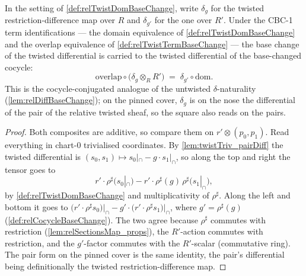 \begin{theorem}
  \label{thm:relTwistDiffBaseChange}
  \leanok
  In the setting of \ref{def:relTwistDomBaseChange}, write \(\delta_g\) for the
  twisted restriction-difference map over \(R\) and \(\delta_{g'}\) for the one over
  \(R'\). Under the CBC-1 term identifications --- the domain equivalence of
  \ref{def:relTwistDomBaseChange} and the overlap equivalence of
  \ref{def:relTwistTermBaseChange} --- the base change of the twisted differential is
  carried to the twisted differential of the base-changed cocycle:
  \[
    \mathrm{overlap}\circ\bigl(\delta_g \otimes_R R'\bigr)
      \;=\; \delta_{g'} \circ \mathrm{dom} .
  \]
  This is the cocycle-conjugated analogue of the untwisted \(\delta\)-naturality
  (\ref{lem:relDiffBaseChange}); on the pinned cover, \(\delta_g\) is on the nose the
  differential of the pair of the relative twisted sheaf, so the square also reads on
  the pairs.
\end{theorem}
\begin{proof}
  \leanok
  Both composites are additive, so compare them on \(r' \otimes (p_0, p_1)\). Read
  everything in chart-0 trivialised coordinates. By \ref{lem:twistTriv_pairDiff} the
  twisted differential is \((s_0, s_1) \mapsto s_0|_{\cap} - g \cdot s_1|_{\cap}\), so
  along the top and right the tensor goes to
  \[
    r' \cdot \rho^{\sharp}\bigl(s_0|_{\cap}\bigr)
      - r' \cdot \rho^{\sharp}(g)\,\rho^{\sharp}\bigl(s_1|_{\cap}\bigr),
  \]
  by \ref{def:relTwistDomBaseChange} and multiplicativity of \(\rho^{\sharp}\). Along
  the left and bottom it goes to
  \(\bigl(r' \cdot \rho^{\sharp}s_0\bigr)\big|_{\cap} - g' \cdot \bigl(r' \cdot
  \rho^{\sharp}s_1\bigr)\big|_{\cap}\), where \(g' = \rho^{\sharp}(g)\)
  (\ref{def:relCocycleBaseChange}). The two agree because \(\rho^{\sharp}\) commutes
  with restriction (\ref{lem:relSectionsMap_props}), the \(R'\)-action commutes with
  restriction, and the \(g'\)-factor commutes with the \(R'\)-scalar (commutative
  ring). The pair form on the pinned cover is the same identity, the pair's
  differential being definitionally the twisted restriction-difference map.
\end{proof}

